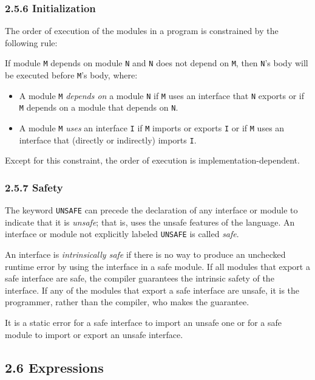 \documentclass[10pt]{article}
\begin{document}
\subsubsection*{2.5.6 Initialization}

The order of execution of the modules in a program is constrained by the
following rule:

If module \verb|M| depends on module \verb|N| and \verb|N| does not depend on
\verb|M|, then \verb|N|'s body will be executed before \verb|M|'s body, where:
\begin{itemize}
\item A module \verb|M| \emph{depends on} a module \verb|N| if \verb|M| uses
  an interface that \verb|N| exports or if \verb|M| depends on a module that
  depends on \verb|N|.
\item A module \verb|M| \emph{uses} an interface \verb|I| if \verb|M| imports
  or exports \verb|I| or if \verb|M| uses an interface that (directly or
  indirectly) imports \verb|I|.
\end{itemize}

Except for this constraint, the order of execution is
implementation-dependent.

\subsubsection*{2.5.7 Safety}

The keyword \verb|UNSAFE| can precede the declaration of any interface or
module to indicate that it is \emph{unsafe}; that is, uses the unsafe features
of the language.  An interface or module not explicitly labeled \verb|UNSAFE|
is called \emph{safe}.

An interface is \emph{intrinsically safe} if there is no way to produce an
unchecked runtime error by using the interface in a safe module.  If all
modules that export a safe interface are safe, the compiler guarantees the
intrinsic safety of the interface.  If any of the modules that export a safe
interface are unsafe, it is the programmer, rather than the compiler, who
makes the guarantee.

It is a static error for a safe interface to import an unsafe one or for a
safe module to import or export an unsafe interface.

\subsection*{2.6 Expressions}
\end{document}
